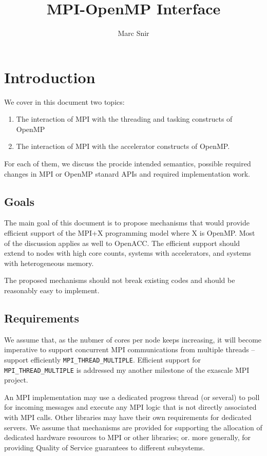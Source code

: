 \documentclass[twoside,11pt]{article}
\title{\LARGE \bf MPI-OpenMP Interface}
\author{Marc Snir}
\begin{document}
 
\maketitle

\section{Introduction}
We cover in this document two topics:
\begin{enumerate}
	\item The interaction of MPI with the threading and tasking constructs of 
	OpenMP
	\item The interaction of MPI with the accelerator constructs of OpenMP.
\end{enumerate}

For each of them, we discuss the procide intended semantics, possible required 
changes in MPI or OpenMP stanard APIs and required implementation work.

\subsection{Goals}
The main goal of this document is to propose mechanisms that would provide 
efficient support of the MPI+X programming 
model where X is OpenMP. Most of the discussion applies as well to OpenACC. The 
efficient support should extend to nodes with high core counts, systems with 
accelerators, and systems with heterogeneous memory. 

The proposed mechanisms should not break existing codes and should be 
reasonably easy to implement.

\subsection{Requirements}
We assume that, as the 
nubmer of cores per node keeps increasing, it will become imperative to support 
concurrent MPI communications from multiple threads -- support efficiently 
\texttt{MPI\_THREAD\_MULTIPLE}. Efficient support for 
\texttt{MPI\_THREAD\_MULTIPLE} is addressed 
my another milestone of the exascale MPI project.

An MPI implementation may use a dedicated progress thread (or several) to poll 
for incoming messages and execute any MPI logic that is not directly associated 
with MPI calls. Other libraries may have their own requirements for dedicated 
servers. We assume that mechanisms are provided for supporting the allocation 
of dedicated hardware resources to MPI or other libraries; or. more generally, 
for providing Quality of Service guarantees to different subsystems.
\end{document}
